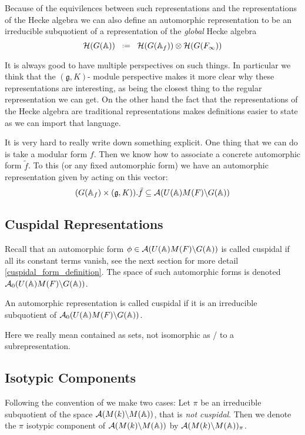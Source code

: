Because of the equivilences between such representations and the representations of the Hecke algebra we can also define an automorphic representation to be an irreducible subquotient of a representation of the \textit{global} Hecke algebra
\[\mathcal{H}(G(\A)) \defeq \mathcal{H}(G(\A_f)) \tensor \mathcal{H}(G(F_\infty))\]

It is always good to have multiple perspectives on such things. In particular we think that the \((\mathfrak{g}, K)\)- module perspective makes it more clear why these representations are interesting, as being the closest thing to the regular representation we can get. On the other hand the fact that the representations of the Hecke algebra are traditional representations makes definitions easier to state as we can import that language. 

\begin{example}
    It is very hard to really write down something explicit. One thing that we can do is take a modular form \(f\). Then we know how to associate a concrete automorphic form \(\tilde{f}\). To this (or any fixed automorphic form) we have an automorphic representation given by acting on this vector:
    \[(G(\A_f)\times (\mathfrak{g}, K)).\tilde{f} \subseteq \mathcal{A}(U(\A)M(F)\backslash G(\A))\]
\end{example}

\subsection{Cuspidal Representations}
Recall that an automorphic form \(\phi\in \mathcal{A}(U(\A)M(F) \backslash G(\A))\) is called cuspidal  if all its constant terms vanish, see the next section for more detail \ref{cuspidal_form_definition}.
The space of such automorphic forms is denoted \(\mathcal{A}_0(U(\A)M(F) \backslash G(\A))\). 

An automorphic representation is called cuspidal if it is an irreducible subquotient of \(\mathcal{A}_0(U(\A)M(F) \backslash G(\A))\).

\begin{Remark}
    Here we really mean contained as sets, not isomorphic as / to a subrepresentation.
\end{Remark}

\subsection{Isotypic Components}\label{automorphic_isotypic_subspaces}
Following the convention of \cite[II.1]{moeglinSpectralDecompositionEisenstein1995} we make two cases:
Let \(\pi\) be an irreducible subquotient of the space \(\mathcal{A}(M(k) \backslash M(\A))\), that is \textit{not cuspidal}. Then we denote the \(\pi\) isotypic component of \(\mathcal{A}(M(k) \backslash M(\A))\) by \(\mathcal{A}(M(k) \backslash M(\A))_\pi\).

